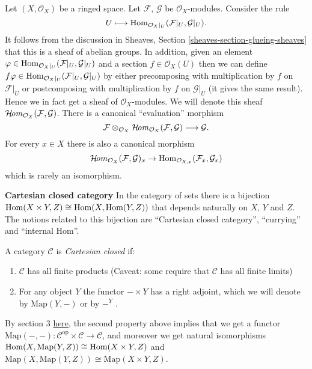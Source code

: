 Let $(X, \mathcal{O}_X)$ be a ringed space.
Let $\mathcal{F}$, $\mathcal{G}$ be $\mathcal{O}_X$-modules.
Consider the rule
$$
U \longmapsto \mathop{\mathrm{Hom}}\nolimits_{\mathcal{O}_X|_U}(\mathcal{F}|_U, \mathcal{G}|_U).
$$
It follows from the discussion in Sheaves, Section
\ref{sheaves-section-glueing-sheaves} that this is a sheaf of
abelian groups. In addition, given an element
$\varphi \in \mathop{\mathrm{Hom}}\nolimits_{\mathcal{O}_X|_U}(\mathcal{F}|_U, \mathcal{G}|_U)$
and a section $f \in \mathcal{O}_X(U)$ then we can define
$f\varphi \in \mathop{\mathrm{Hom}}\nolimits_{\mathcal{O}_X|_U}(\mathcal{F}|_U, \mathcal{G}|_U)$
by either precomposing with multiplication by $f$ on $\mathcal{F}|_U$
or postcomposing with multiplication by $f$ on $\mathcal{G}|_U$ (it gives
the same result). Hence we in fact get a sheaf of $\mathcal{O}_X$-modules.
We will denote this sheaf
$\mathop{\mathcal{H}\!\mathit{om}}\nolimits_{\mathcal{O}_X}(\mathcal{F}, \mathcal{G})$.
There is a canonical ``evaluation'' morphism
$$
\mathcal{F}
\otimes_{\mathcal{O}_X}
\mathop{\mathcal{H}\!\mathit{om}}\nolimits_{\mathcal{O}_X}(\mathcal{F}, \mathcal{G})
\longrightarrow
\mathcal{G}.
$$
For every $x \in X$ there is also a canonical morphism
$$
\mathop{\mathcal{H}\!\mathit{om}}\nolimits_{\mathcal{O}_X}(\mathcal{F}, \mathcal{G})_x
\to
\mathop{\mathrm{Hom}}\nolimits_{\mathcal{O}_{X, x}}(\mathcal{F}_x, \mathcal{G}_x)
$$
which is rarely an isomorphism.

\medskip\noindent
{\bf Cartesian closed category} In the category of sets there is a bijection
$\mathop{\mathrm{Hom}}\nolimits(X\times Y, Z)\cong \mathop{\mathrm{Hom}}\nolimits(X, \text{Hom}(Y, Z))$ that depends
naturally on $X$, $Y$ and $Z$. The notions related to this bijection are
“Cartesian closed category”, “currying” and “internal Hom”.

\begin{definition}
\label{definition-Cartesian-closed-category}
A category $\mathcal{C}$ is {\it Cartesian closed} if:
\begin{enumerate}
\item $\mathcal{C}$ has all finite products 
(Caveat: some require that $\mathcal{C}$ has all finite limits)
\item For any object $Y$ the functor $- \times Y$ has a right adjoint,
which we will denote by $\text{Map}(Y,-)$ or by $-^Y$ .
\end{enumerate}
\end{definition}

\begin{remark}
\label{remark-currying}
By section 3 \href{https://ncatlab.org/nlab/show/internal+hom }{here}, the
second property above implies that we get a functor 
$\text{Map}(-,-) :\mathcal{C}^{\text{op}} \times \mathcal{C} \to \mathcal{C}$,
and moreover we get natural isomorphisms 
$\mathop{\mathrm{Hom}}\nolimits(X, \text{Map}(Y, Z)) \cong \mathop{\mathrm{Hom}}\nolimits(X \times Y, Z)$
and $\text{Map}(X, \text{Map}(Y, Z))\cong \text{Map}(X \times Y, Z)$.
\end{remark}

